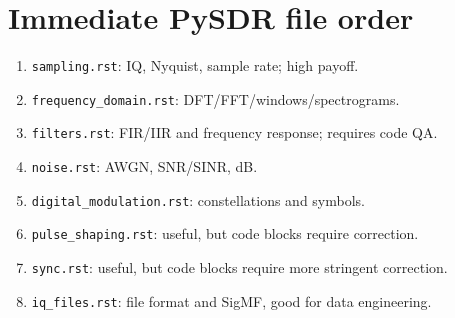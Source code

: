 \section{Immediate PySDR file order}
\begin{enumerate}
\item \texttt{sampling.rst}: IQ, Nyquist, sample rate; high payoff.
\item \texttt{frequency\_domain.rst}: DFT/FFT/windows/spectrograms.
\item \texttt{filters.rst}: FIR/IIR and frequency response; requires code QA.
\item \texttt{noise.rst}: AWGN, SNR/SINR, dB.
\item \texttt{digital\_modulation.rst}: constellations and symbols.
\item \texttt{pulse\_shaping.rst}: useful, but code blocks require correction.
\item \texttt{sync.rst}: useful, but code blocks require more stringent correction.
\item \texttt{iq\_files.rst}: file format and SigMF, good for data engineering.
\end{enumerate}


